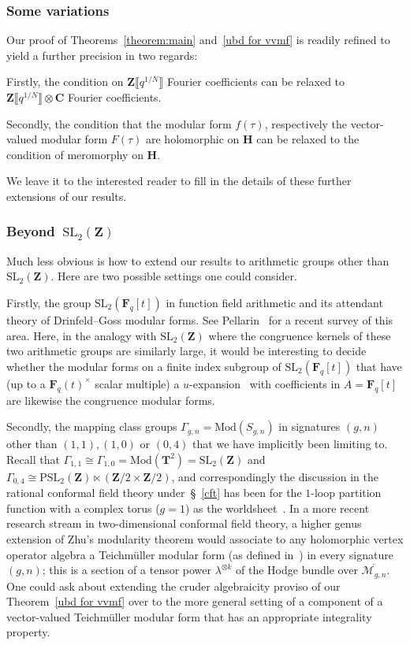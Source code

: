 \documentclass[10pt]{amsart}
\def\PSL{\mathrm{PSL}}
\def\SSS{\S}
\def\SSSS{\S}
\def\F{\mathbf{F}}
\def\Z{\mathbf{Z}}
\renewcommand\mathbb{\mathbf}
\theoremstyle{remark}
\numberwithin{equation}{subsection}
\def\C{\mathbf{C}}
\def\SL{\mathrm{SL}}
\def\H{\mathbf{H}}
\begin{document}
\subsubsection{Some variations}  \label{the easy ones}
Our proof of Theorems~\ref{theorem:main} and~\ref{ubd for vvmf} is readily refined to yield a further precision in two regards: 

Firstly, the condition on $\Z\llbracket q^{1/N} \rrbracket$ Fourier coefficients can be relaxed to $\Z\llbracket q^{1/N} \rrbracket \otimes \C$ Fourier coefficients.

Secondly, the condition that the modular form $f(\tau)$, respectively the vector-valued modular form $F(\tau)$ are holomorphic on $\H$ can be relaxed to the condition of meromorphy on $\H$. 

We leave it to the interested reader to  fill in the details of these further extensions of our results. 


\subsubsection{Beyond~$\SL_2(\Z)$} Much less obvious is how to extend our results to arithmetic groups other than $\SL_2(\Z)$. Here 
are two possible settings one could consider. 




 Firstly, the group $\SL_2(\F_q[t])$ in function field arithmetic  and its attendant theory of Drinfeld--Goss modular forms. 
See Pellarin~\cite{Pellarin} for a recent  survey of this area. 
Here, in the analogy with $\SL_2(\Z)$ where the congruence kernels of these two arithmetic groups are similarly large, it would be interesting to decide whether the modular forms on a finite index subgroup of $\SL_2(\F_q[t])$ that have (up to a $\F_q(t)^{\times}$ scalar multiple) a $u$-expansion~\cite[\SSS~4.7.1]{Pellarin} with coefficients in $A = \F_q[t]$ are likewise the congruence modular forms. 

 Secondly, the mapping class groups $\Gamma_{g,n} = \mathrm{Mod}(S_{g,n})$ in  signatures $(g,n)$ 
other than $(1,1), (1,0)$ or $(0,4)$ that we have implicitly been limiting to.  Recall that $\Gamma_{1,1}\cong \Gamma_{1,0}  = \mathrm{Mod}(\mathbb{T}^2) = \SL_2(\Z)$ and $\Gamma_{0,4} \cong \PSL_2(\Z) \ltimes (\Z/2 \times \Z/2)$, and correspondingly the discussion in the rational conformal field theory under~\SSSS~\ref{cft} has been for the $1$-loop partition function with  a complex torus ($g = 1$) as the worldsheet~\cite{Gannon}. 
In a more recent
research stream in two-dimensional conformal field theory, a  higher genus extension of Zhu's modularity theorem 
would  associate to any holomorphic vertex operator  algebra a Teichm\"uller modular form (as defined in~\cite{Ichikawa})
in every signature $(g,n)$; this is a section of a tensor power
  $\lambda^{\otimes k}$ of the Hodge bundle over $\overline{\mathcal{M}_{g,n}}$.
  One could ask about extending the cruder algebraicity proviso of our Theorem~\ref{ubd for vvmf} over to
the more general setting of a component of a vector-valued Teichm\"uller modular form that has an appropriate integrality property. 
\end{document}
